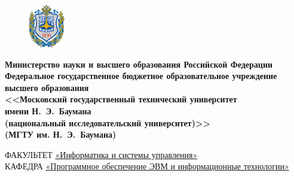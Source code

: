 \documentclass[a4paper]{article}
\begin{document}
	\begin{titlepage}
		\centering
		\begin{figure}
			\vspace{5mm}
			\hspace{-5.8mm}
			\includegraphics[width=0.93\linewidth]{gerb}
		\end{figure}
		{\singlespacing \footnotesize \bfseries Министерство науки и высшего образования Российской Федерации\\Федеральное государственное бюджетное образовательное учреждение\\высшего образования\\<<Московский государственный технический университет\\имени Н.~Э.~Баумана\\ (национальный исследовательский университет)>>\\(МГТУ им. Н.~Э.~Баумана)\\}
		
		\textbf {\bf \underline{\hspace{\linewidth}}}
	
		\doublespacing \small \raggedright ФАКУЛЬТЕТ \hspace{25mm} \underline { «Информатика и системы управления»}\\
		КАФЕДРА \hspace{5mm} \underline {«Программное обеспечение ЭВМ и информационные технологии»}\\
		

\end{titlepage}
\end{document}
